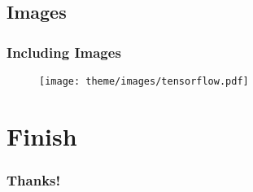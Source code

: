 \documentclass{beamer}
\begin{document}
\subsection{Images}
\begin{frame}
	\frametitle{Including Images}

	\begin{figure}
		\centering
		\texttt{[image: theme/images/tensorflow.pdf]}
	\end{figure}

\end{frame}

\section{Finish}
\begin{frame}
	\frametitle{Thanks!}
\end{frame}
\end{document}

